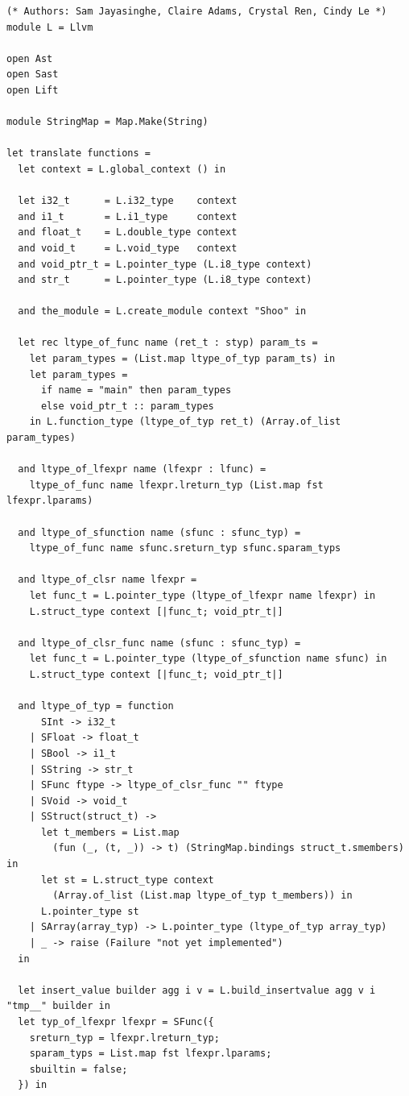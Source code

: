 \documentclass[12pt]{article}
\begin{document}
\begin{mdframed}[hidealllines=true,backgroundcolor=blue!20]
\begin{lstlisting}
(* Authors: Sam Jayasinghe, Claire Adams, Crystal Ren, Cindy Le *)
module L = Llvm

open Ast
open Sast
open Lift

module StringMap = Map.Make(String)

let translate functions =
  let context = L.global_context () in

  let i32_t      = L.i32_type    context
  and i1_t       = L.i1_type     context
  and float_t    = L.double_type context
  and void_t     = L.void_type   context
  and void_ptr_t = L.pointer_type (L.i8_type context)
  and str_t      = L.pointer_type (L.i8_type context)

  and the_module = L.create_module context "Shoo" in

  let rec ltype_of_func name (ret_t : styp) param_ts =
    let param_types = (List.map ltype_of_typ param_ts) in
    let param_types =
      if name = "main" then param_types
      else void_ptr_t :: param_types
    in L.function_type (ltype_of_typ ret_t) (Array.of_list param_types)

  and ltype_of_lfexpr name (lfexpr : lfunc) =
    ltype_of_func name lfexpr.lreturn_typ (List.map fst lfexpr.lparams)

  and ltype_of_sfunction name (sfunc : sfunc_typ) =
    ltype_of_func name sfunc.sreturn_typ sfunc.sparam_typs

  and ltype_of_clsr name lfexpr =
    let func_t = L.pointer_type (ltype_of_lfexpr name lfexpr) in
    L.struct_type context [|func_t; void_ptr_t|]

  and ltype_of_clsr_func name (sfunc : sfunc_typ) =
    let func_t = L.pointer_type (ltype_of_sfunction name sfunc) in
    L.struct_type context [|func_t; void_ptr_t|]

  and ltype_of_typ = function
      SInt -> i32_t
    | SFloat -> float_t
    | SBool -> i1_t
    | SString -> str_t
    | SFunc ftype -> ltype_of_clsr_func "" ftype
    | SVoid -> void_t
    | SStruct(struct_t) ->
      let t_members = List.map 
        (fun (_, (t, _)) -> t) (StringMap.bindings struct_t.smembers) in
      let st = L.struct_type context 
        (Array.of_list (List.map ltype_of_typ t_members)) in
      L.pointer_type st
    | SArray(array_typ) -> L.pointer_type (ltype_of_typ array_typ) 
    | _ -> raise (Failure "not yet implemented")
  in

  let insert_value builder agg i v = L.build_insertvalue agg v i "tmp__" builder in
  let typ_of_lfexpr lfexpr = SFunc({
    sreturn_typ = lfexpr.lreturn_typ;
    sparam_typs = List.map fst lfexpr.lparams;
    sbuiltin = false;
  }) in


\end{lstlisting}
\end{mdframed}
\end{document}
